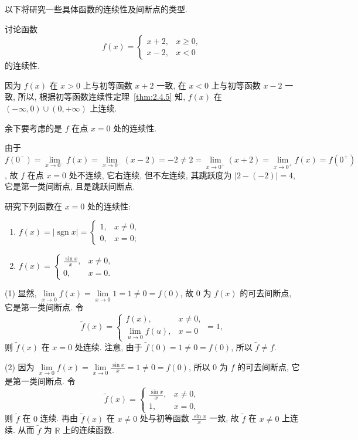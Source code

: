 以下将研究一些具体函数的连续性及间断点的类型.

\begin{example}\label{ex:2.4.2}
讨论函数
\[
f(x) = \begin{cases} x + 2, & x \geqslant 0, \\ x - 2, & x < 0 \end{cases}
\]
的连续性.
\end{example}

\begin{solution}
因为 $f(x)$ 在 $x > 0$ 上与初等函数 $x + 2$ 一致, 在 $x < 0$ 上与初等函数 $x - 2$ 一致, 所以, 根据初等函数连续性定理~\ref{thm:2.4.5} 知, $f(x)$ 在 $(-\infty, 0) \cup (0, +\infty)$ 上连续.

余下要考虑的是 $f$ 在点 $x = 0$ 处的连续性.

由于 $f(0^-) = \lim\limits_{x \to 0^-} f(x) = \lim\limits_{x \to 0^-} (x - 2) = -2 \neq 2 = \lim\limits_{x \to 0^+} (x + 2) = \lim\limits_{x \to 0^+} f(x) = f(0^+)$, 故 $f$ 在点 $x = 0$ 处不连续, 它右连续, 但不左连续, 其跳跃度为 $|2 - (-2)| = 4$, 它是第一类间断点, 且是跳跃间断点.
\end{solution}

\begin{example}\label{ex:2.4.3}
研究下列函数在 $x = 0$ 处的连续性:
\begin{enumerate}[label=(\arabic*)]
  \item $f(x) = |\operatorname{sgn} x| = \begin{cases} 1, & x \neq 0, \\ 0, & x = 0; \end{cases}$
  \item $f(x) = \begin{cases} \frac{\sin x}{x}, & x \neq 0, \\ 0, & x = 0. \end{cases}$
\end{enumerate}
\end{example}

\begin{solution}
(1) 显然, $\lim\limits_{x \to 0} f(x) = \lim\limits_{x \to 0} 1 = 1 \neq 0 = f(0)$, 故 $0$ 为 $f(x)$ 的可去间断点, 它是第一类间断点. 令
\[
\tilde{f}(x) = \begin{cases} f(x), & x \neq 0, \\ \lim\limits_{u \to 0} f(u), & x = 0 \end{cases} = 1,
\]
则 $\tilde{f}(x)$ 在 $x = 0$ 处连续. 注意, 由于 $\tilde{f}(0) = 1 \neq 0 = f(0)$, 所以 $\tilde{f} \neq f$.

(2) 因为 $\lim\limits_{x \to 0} f(x) = \lim\limits_{x \to 0} \frac{\sin x}{x} = 1 \neq 0 = f(0)$, 所以 $0$ 为 $f$ 的可去间断点, 它是第一类间断点. 令
\[
\tilde{f}(x) = \begin{cases} \frac{\sin x}{x}, & x \neq 0, \\ 1, & x = 0, \end{cases}
\]
则 $\tilde{f}$ 在 $0$ 连续. 再由 $\tilde{f}(x)$ 在 $x \neq 0$ 处与初等函数 $\frac{\sin x}{x}$ 一致, 故 $\tilde{f}$ 在 $x \neq 0$ 上连续. 从而 $\tilde{f}$ 为 $\mathbb{R}$ 上的连续函数.
\end{solution}


